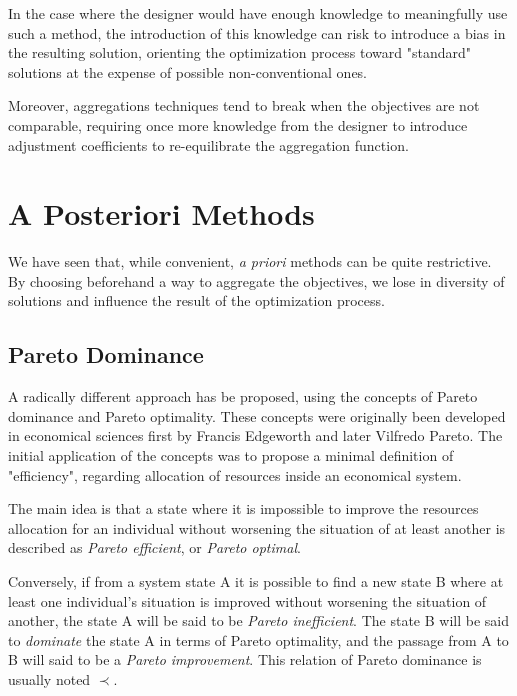 In the case where the designer would have enough knowledge to meaningfully use such a method, the introduction of this knowledge can risk to introduce a bias in the resulting solution, orienting the optimization process toward "standard" solutions at the expense of possible non-conventional ones.

Moreover, aggregations techniques tend to break when the objectives are not comparable, requiring once more knowledge from the designer to introduce adjustment coefficients to re-equilibrate the aggregation function.

\section{A Posteriori Methods}

We have seen that, while convenient, \emph{a priori} methods can be quite restrictive. By choosing beforehand a way to aggregate the objectives, we lose in diversity of solutions and influence the result of the optimization process.

\subsection{Pareto Dominance}

A radically different approach has be proposed, using the concepts of Pareto dominance and Pareto optimality. These concepts were originally been developed in economical sciences first by Francis Edgeworth and later Vilfredo Pareto. The initial application of the concepts was to propose a minimal definition of "efficiency", regarding allocation of resources inside an economical system.

The main idea is that a state where it is impossible to improve the resources allocation for an individual without worsening the situation of at least another is described as \emph{Pareto efficient}, or \emph{Pareto optimal}.

Conversely, if from a system state A it is possible to find a new state B where at least one individual's situation is improved without worsening the situation of another, the state A will be said to be \emph{Pareto inefficient}. The state B will be said to \emph{dominate} the state A in terms of Pareto optimality, and the passage from A to B will said to be a \emph{Pareto improvement}. This relation of Pareto dominance is usually noted \(\prec\).


